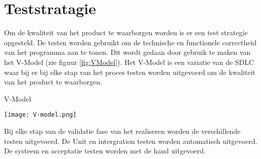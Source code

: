 \section{Teststratagie}
Om de kwaliteit van het product te waarborgen worden is er een test strategie opgesteld.
De testen worden gebruikt om de technische en functionele correctheid van het programma aan te tonen.
Dit wordt gedaan door gebruik te maken van het V-Model \parencite{VModel} (zie figuur \ref{fig:VModel}).
Het V-Model is een variatie van de SDLC waar bij er bij elke stap van het proces testen worden uitgevoerd om de kwaliteit van het product te waarborgen.

\whitespace
\begin{graphic}
    \captionsetup{type=figure}
    \caption{V-Model \parencite{VModel}}
    \texttt{[image: V-model.png]}
    \label{fig:VModel}
\end{graphic}

\whitespace
Bij elke stap van de validatie fase van het realiseren worden de verschillende testen uitgevoerd.
De Unit en intergration testen worden automatisch uitgevoerd.
De systeem en acceptatie testen worden met de hand uitgevoerd.
